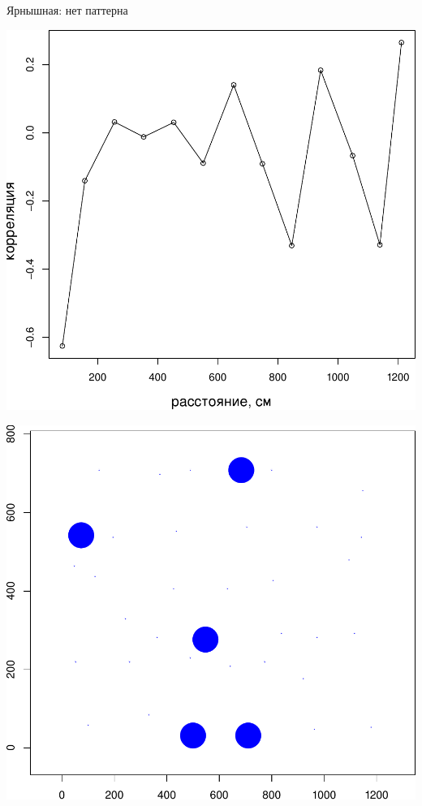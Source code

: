 \documentclass{beamer}
\begin{document}
\begin{frame}{Ярнышная: нет паттерна}
	\begin{minipage}[t]{.7\linewidth}
 \begin{center}
		\includegraphics[width=\textwidth]{Yarnyshnaya07_moran_N_Macoma_balthica_.pdf}
 \end{center}
	\end{minipage}
	\begin{minipage}[t]{.28\linewidth}
 \begin{center}
		\includegraphics[width=\textwidth]{Yarnyshnaya_N_cockle_bubbles.pdf}
 \end{center}
	\end{minipage}
\end{frame}
\end{document}
